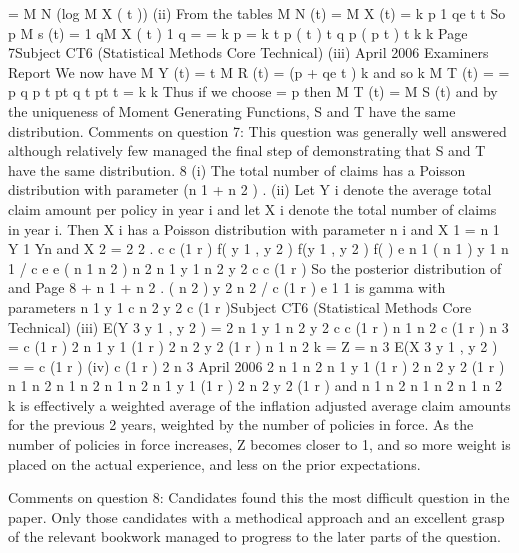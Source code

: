 \documentclass[a4paper,12pt]{article}
\begin{document}
= M N (log M X ( t ))
(ii)
From the tables
M N (t) =
M X (t) =
k
p
1 qe t
t
So
p
M s (t) =
1 qM X ( t )
1 q
=
=
k
p
=
k
t
p ( t )
t q
p (
p t )
t
k
k
Page 7Subject CT6 (Statistical Methods Core Technical)
(iii)
April 2006
Examiners Report
We now have
M Y (t) =
t
M R (t) = (p + qe t ) k
and so
k
M T (t) =
=
p q
p
t
pt q
t
pt
t
=
k
k
Thus if we choose = p then M T (t) = M S (t) and by the uniqueness of
Moment Generating Functions, S and T have the same distribution.
Comments on question 7: This question was generally well answered although relatively few
managed the final step of demonstrating that S and T have the same distribution.
8
(i) The total number of claims has a Poisson distribution with parameter
(n 1 + n 2 ) .
(ii) Let Y i denote the average total claim amount per policy in year i and let X i
denote the total number of claims in year i. Then X i has a Poisson distribution
with parameter n i and
X 1 =
n 1 Y 1
Yn
and X 2 = 2 2 .
c
c (1 r )
f( y 1 , y 2 )
f(y 1 , y 2 ) f( )
e n 1 ( n 1 ) y 1 n 1 / c e
e ( n 1 n 2 )
n 2
n 1 y 1 n 2 y 2
c c (1 r )
So the posterior distribution of
and
Page 8
+ n 1 + n 2 .
( n 2 ) y 2 n 2 / c (1
r )
e
1
1
is gamma with parameters
n 1 y 1
c
n 2 y 2
c (1 r )Subject CT6 (Statistical Methods Core Technical)
(iii)
E(Y 3 y 1 , y 2 ) =
2
n 1 y 1
n 2 y 2
c
c (1 r )
n 1 n 2
c (1 r )
n 3
= c (1 r ) 2 n 1 y 1 (1 r ) 2 n 2 y 2 (1 r )
n 1 n 2
k =
Z =
n 3
E(X 3 y 1 , y 2 )
=
= c (1 r )
(iv)
c (1 r ) 2
n 3
April 2006
2
n 1 n 2
n 1 y 1 (1 r ) 2 n 2 y 2 (1 r )
n 1 n 2
n 1 n 2
n 1 n 2
n 1 y 1 (1 r ) 2 n 2 y 2 (1 r )
and
n 1 n 2
n 1 n 2
n 1 n 2
k is effectively a weighted average of the inflation adjusted average claim amounts for the previous 2 years, weighted by the number of policies in force. As the number of policies in force increases, Z becomes closer to 1, and so more weight is placed on the actual experience, and less on the prior expectations.

Comments on question 8: Candidates found this the most difficult question in the paper.
Only those candidates with a methodical approach and an excellent grasp of the relevant bookwork managed to progress to the later parts of the question.
\end{document}
